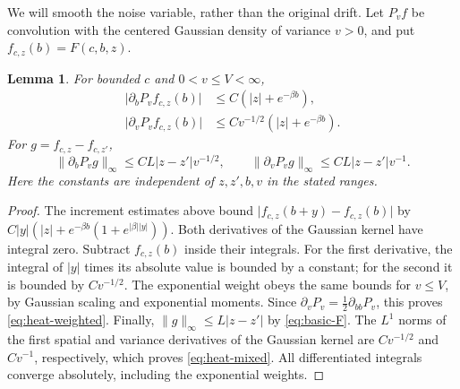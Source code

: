 \documentclass[11pt]{article}
\newtheorem{lemma}[theorem]{Lemma}
\theoremstyle{remark}
\newcommand{\norm}[1]{\lVert#1\rVert}
\newcommand{\abs}[1]{\lvert#1\rvert}
\begin{document}
We will smooth the noise variable, rather than the original drift.
Let \(P_v f\) be convolution with the centered Gaussian density of
variance \(v>0\), and put \(f_{c,z}(b)=F(c,b,z)\).

\begin{lemma}\label{lem:heat}
For bounded \(c\) and \(0<v\le V<\infty\),
\begin{align}
 \abs{\partial_bP_vf_{c,z}(b)}
    &\le C(\abs z+e^{-\beta b}),\label{eq:heat-weighted}\\
 \abs{\partial_vP_vf_{c,z}(b)}
    &\le Cv^{-1/2}(\abs z+e^{-\beta b}).\nonumber
\end{align}
For \(g=f_{c,z}-f_{c,z'}\),
\begin{equation}\label{eq:heat-mixed}
 \norm{\partial_bP_vg}_\infty\le CL\abs{z-z'}v^{-1/2},
 \qquad
 \norm{\partial_vP_vg}_\infty\le CL\abs{z-z'}v^{-1}.
\end{equation}
Here the constants are independent of \(z,z',b,v\) in the stated ranges.
\end{lemma}
\begin{proof}
The increment estimates above bound \(\abs{f_{c,z}(b+y)-f_{c,z}(b)}\)
by \(C\abs y(\abs z+e^{-\beta b}(1+e^{\abs\beta\abs y}))\).
Both derivatives of the Gaussian kernel have integral zero. Subtract
\(f_{c,z}(b)\) inside their integrals. For the first derivative,
the integral of \(\abs y\) times its absolute value is bounded by a
constant; for the second it is bounded by \(Cv^{-1/2}\).
The exponential weight obeys the same bounds for \(v\le V\), by Gaussian
scaling and exponential moments. Since
\(\partial_vP_v=\tfrac12\partial_{bb}P_v\), this proves
\eqref{eq:heat-weighted}. Finally,
\(\norm g_\infty\le L\abs{z-z'}\) by \eqref{eq:basic-F}.
The \(L^1\) norms of the first spatial and variance derivatives of the
Gaussian kernel are \(Cv^{-1/2}\) and \(Cv^{-1}\), respectively, which
proves \eqref{eq:heat-mixed}. All differentiated integrals converge
absolutely, including the exponential weights.
\end{proof}
\end{document}
